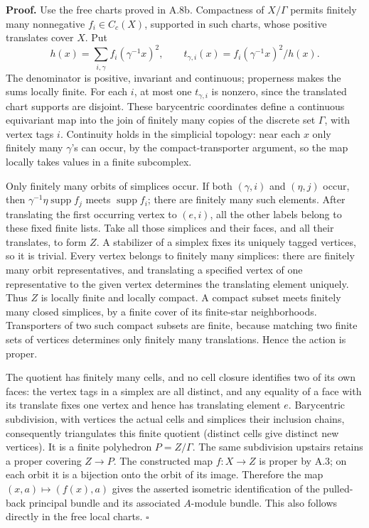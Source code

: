 \documentclass[
  11pt,
]{article}
\begin{document}
\textbf{Proof.} Use the free charts proved in A.8b. Compactness of
\(X/\Gamma\) permits finitely many nonnegative \(f_i\in C_c(X)\),
supported in such charts, whose positive translates cover \(X\). Put \[
 h(x)=\sum_{i,\gamma}f_i(\gamma^{-1}x)^2,\qquad
 t_{\gamma,i}(x)=f_i(\gamma^{-1}x)^2/h(x).
 \tag{R1}
\] The denominator is positive, invariant and continuous; properness
makes the sums locally finite. For each \(i\), at most one
\(t_{\gamma,i}\) is nonzero, since the translated chart supports are
disjoint. These barycentric coordinates define a continuous equivariant
map into the join of finitely many copies of the discrete set
\(\Gamma\), with vertex tags \(i\). Continuity holds in the simplicial
topology: near each \(x\) only finitely many \(\gamma\)'s can occur, by
the compact-transporter argument, so the map locally takes values in a
finite subcomplex.

Only finitely many orbits of simplices occur. If both \((\gamma,i)\) and
\((\eta,j)\) occur, then \(\gamma^{-1}\eta\operatorname{supp}f_j\) meets
\(\operatorname{supp}f_i\); there are finitely many such elements. After
translating the first occurring vertex to \((e,i)\), all the other
labels belong to these fixed finite lists. Take all those simplices and
their faces, and all their translates, to form \(Z\). A stabilizer of a
simplex fixes its uniquely tagged vertices, so it is trivial. Every
vertex belongs to finitely many simplices: there are finitely many orbit
representatives, and translating a specified vertex of one
representative to the given vertex determines the translating element
uniquely. Thus \(Z\) is locally finite and locally compact. A compact
subset meets finitely many closed simplices, by a finite cover of its
finite-star neighborhoods. Transporters of two such compact subsets are
finite, because matching two finite sets of vertices determines only
finitely many translations. Hence the action is proper.

The quotient has finitely many cells, and no cell closure identifies two
of its own faces: the vertex tags in a simplex are all distinct, and any
equality of a face with its translate fixes one vertex and hence has
translating element \(e\). Barycentric subdivision, with vertices the
actual cells and simplices their inclusion chains, consequently
triangulates this finite quotient (distinct cells give distinct new
vertices). It is a finite polyhedron \(P=Z/\Gamma\). The same
subdivision upstairs retains a proper covering \(Z\to P\). The
constructed map \(f:X\to Z\) is proper by A.3; on each orbit it is a
bijection onto the orbit of its image. Therefore the map
\((x,a)\mapsto(f(x),a)\) gives the asserted isometric identification of
the pulled-back principal bundle and its associated \(A\)-module bundle.
This also follows directly in the free local charts. \(\square\)
\end{document}
